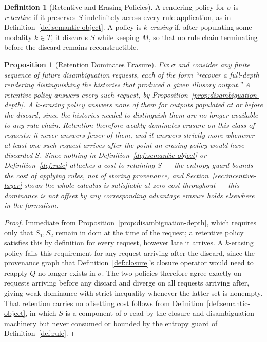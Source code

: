 \documentclass[11pt]{article}
\newtheorem{proposition}[theorem]{Proposition}
\theoremstyle{definition}
\newtheorem{definition}[theorem]{Definition}
\begin{document}
\begin{definition}[Retentive and Erasing Policies]
\label{def:policies}
A rendering policy for $\sigma$ is \emph{retentive} if it preserves $S$ indefinitely across every rule application, as in Definition~\ref{def:semantic-object}. A policy is \emph{$k$-erasing} if, after populating some modality $k \in T$, it discards $S$ while keeping $M$, so that no rule chain terminating before the discard remains reconstructible.
\end{definition}

\begin{proposition}[Retention Dominates Erasure]
\label{prop:dominance}
Fix $\sigma$ and consider any finite sequence of future disambiguation requests, each of the form ``recover a full-depth rendering distinguishing the histories that produced a given illusory output.'' A retentive policy answers every such request, by Proposition~\ref{prop:disambiguation-depth}. A $k$-erasing policy answers none of them for outputs populated at or before the discard, since the histories needed to distinguish them are no longer available to any rule chain. Retention therefore weakly dominates erasure on this class of requests: it never answers fewer of them, and it answers strictly more whenever at least one such request arrives after the point an erasing policy would have discarded $S$. Since nothing in Definition~\ref{def:semantic-object} or Definition~\ref{def:rule} attaches a cost to retaining $S$ --- the entropy guard bounds the cost of \emph{applying} rules, not of storing provenance, and Section~\ref{sec:incentive-layer} shows the whole calculus is satisfiable at zero cost throughout --- this dominance is not offset by any corresponding advantage erasure holds elsewhere in the formalism.
\end{proposition}

\begin{proof}
Immediate from Proposition~\ref{prop:disambiguation-depth}, which requires only that $S_1, S_2$ remain in $\mathrm{dom}$ at the time of the request; a retentive policy satisfies this by definition for every request, however late it arrives. A $k$-erasing policy fails this requirement for any request arriving after the discard, since the provenance graph that Definition~\ref{def:closure}'s closure operator would need to reapply $Q$ no longer exists in $\sigma$. The two policies therefore agree exactly on requests arriving before any discard and diverge on all requests arriving after, giving weak dominance with strict inequality whenever the latter set is nonempty. That retention carries no offsetting cost follows from Definition~\ref{def:semantic-object}, in which $S$ is a component of $\sigma$ read by the closure and disambiguation machinery but never consumed or bounded by the entropy guard of Definition~\ref{def:rule}.
\end{proof}
\end{document}
